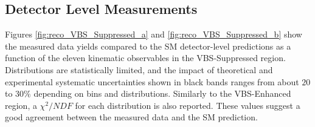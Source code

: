 \subsection{Detector Level Measurements}
\label{appendix:VBSSupReco}

Figures \ref{fig:reco_VBS_Suppressed_a} and \ref{fig:reco_VBS_Suppressed_b} show the measured data yields compared to the SM detector-level predictions as a function of the eleven kinematic observables in the VBS-Suppressed region. Distributions are statistically limited, and the impact of theoretical and experimental systematic uncertainties shown in black bands ranges from about $20$ to $30\%$ depending on bins and distributions. Similarly to the VBS-Enhanced region, a $\chi^2/NDF$ for each distribution is also reported. These values suggest a good agreement between the measured data and the SM prediction. 


